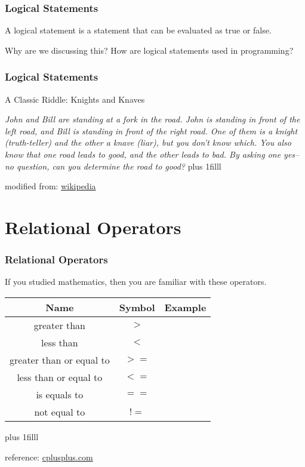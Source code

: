 \documentclass[fleqn]{beamer} %
\newcommand{\sectiontitleI}{Logical Statements} %
\newcommand{\sectiontitleII}{Relational Operators}
\newcommand{\btVFill}{\vskip0pt plus 1filll}
\begin{document}
	\begin{frame}[label=sectionII,containsverbatim] \small
		\frametitle{\sectiontitleI}
		
A {\PR logical statement} is a statement that can be evaluated as {\GR true} or {\RD false}. \vspcc

Why are we discussing this? How are logical statements used in programming? \vspcc

	\end{frame}

	\begin{frame} \small
		\frametitle{\sectiontitleI}
		
		A Classic Riddle: Knights and Knaves \vspccc
		
		{\it John and Bill are standing at a fork in the road. John is standing in front of the left road, and Bill is standing in front of the right road. One of them is a knight (truth-teller) and the other a knave (liar), but you don't know which. You also know that one road leads to good, and the other leads to bad. By asking one yes–no question, can you determine the road to good?} 
		\btVFill
		
		\tiny{modified from: \href{https://en.wikipedia.org/wiki/Knights_and_Knaves}{wikipedia} } 	

	\end{frame}	

\section{\sectiontitleII}

	\begin{frame}[label=sectionII,containsverbatim] \small
	\frametitle{\sectiontitleII}
	
	If you studied mathematics, then you are familiar with these operators.  \vspace{5mm}\\
			
		\renewcommand*{\arraystretch}{1.5}
		\begin{tabular}{c|c|c} 
			Name&Symbol&Example\\ \hline
			greater than&$>$ & \\ \hline
			less than&$<$ & \\ \hline
			greater than or equal to&$>=$ & \\ \hline
			less than or equal to&$<=$ & \\ \hline
			is equals to&$==$ & \\ \hline
			not equal to&$!=$ & \\ \hline
		\end{tabular}
		
	
	\btVFill
	
	\tiny{reference: \href{https://www.cplusplus.com/doc/tutorial/operators/}{cplusplus.com} } 	
	
	\end{frame}      
\end{document}
